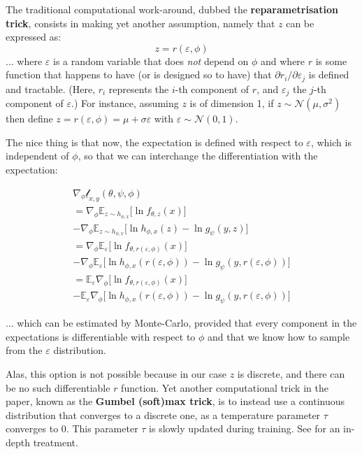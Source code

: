 \documentclass{article}
\begin{document}
\begin{appendix}
\begin{multicols}{2}
The traditional computational work-around, dubbed the \textbf{reparametrisation trick}, consists in making yet another assumption, namely that $z$ can be expressed as:
$$z=r(\varepsilon, \phi)$$
... where $\varepsilon$ is a random variable that does \textit{not} depend on $\phi$ and where $r$ is some function that happens to have (or is designed so to have) that $\partial r_i / \partial \varepsilon_j$ is defined and tractable. (Here, $r_i$ represents the $i$-th component of $r$, and $\varepsilon_j$ the $j$-th component of $\varepsilon$.) For instance, assuming $z$ is of dimension 1, if $z\sim \mathcal{N}(\mu,\sigma^2)$ then define $z=r(\varepsilon, \phi)=\mu+\sigma \varepsilon$ with $\varepsilon\sim\mathcal{N}(0,1)$.

The nice thing is that now, the expectation is defined with respect to $\varepsilon$, which is independent of $\phi$, so that we can interchange the differentiation with the expectation:

\begin{gather*}
\nabla_\phi\underline{\mathscr{l}}_{x,y}(\theta,\psi,\phi) \\
= \nabla_\phi \mathbb{E}_{z\sim h_{\phi,x}} \big[ \ln f_{\theta,z}(x) \big] \\
- \nabla_\phi \mathbb{E}_{z\sim h_{\phi,x}}\Big[\ln h_{\phi,x}(z) - \ln g_\psi(y,z)  \Big] \\
= \nabla_\phi \mathbb{E}_{\varepsilon} \big[ \ln f_{\theta,r(\varepsilon,\phi)}(x) \big] \\
- \nabla_\phi \mathbb{E}_{\varepsilon}\Big[\ln h_{\phi,x}(r(\varepsilon,\phi)) - \ln g_\psi(y,r(\varepsilon,\phi))  \Big] \\
= \mathbb{E}_{\varepsilon} \nabla_\phi \big[ \ln f_{\theta,r(\varepsilon,\phi)}(x) \big] \\
- \mathbb{E}_{\varepsilon} \nabla_\phi \Big[\ln h_{\phi,x}(r(\varepsilon,\phi)) - \ln g_\psi(y,r(\varepsilon,\phi))  \Big]
\end{gather*}

... which can be estimated by Monte-Carlo, provided that every component in the expectations is differentiable with respect to $\phi$ and that we know how to sample from the $\varepsilon$ distribution.

Alas, this option is not possible because in our case $z$ is discrete, and there can be no such differentiable $r$ function. Yet another computational trick in the paper, known as the \textbf{Gumbel (soft)max trick}, is to instead use a continuous distribution that converges to a discrete one, as a temperature parameter $\tau$ converges to $0$. This parameter $\tau$ is slowly updated during training. See \citet{gumbelmaxtrick} for an in-depth treatment.


\end{multicols}
\end{appendix}
\end{document}
